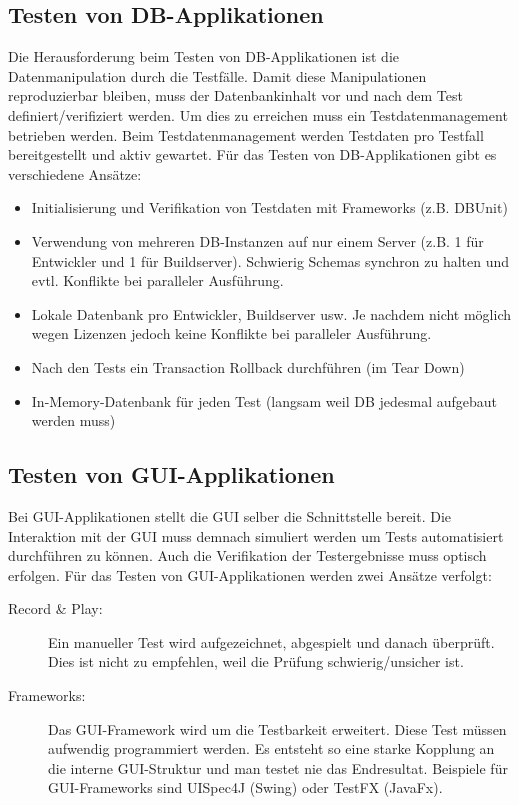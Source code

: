 \subsection{Testen von DB-Applikationen}

Die Herausforderung beim Testen von DB-Applikationen ist die Datenmanipulation durch die Testfälle. Damit diese Manipulationen reproduzierbar bleiben, muss der Datenbankinhalt vor und nach dem Test definiert/verifiziert werden. Um dies zu erreichen muss ein Testdatenmanagement betrieben werden. Beim Testdatenmanagement werden Testdaten pro Testfall bereitgestellt und aktiv gewartet.
Für das Testen von DB-Applikationen gibt es verschiedene Ansätze:
\begin{itemize}
	\item Initialisierung und Verifikation von Testdaten mit Frameworks (z.B. DBUnit)
	\item Verwendung von mehreren DB-Instanzen auf nur einem Server (z.B. 1 für Entwickler und 1 für Buildserver). Schwierig Schemas synchron zu halten und evtl. Konflikte bei paralleler Ausführung.
	\item Lokale Datenbank pro Entwickler, Buildserver usw. Je nachdem nicht möglich wegen Lizenzen jedoch keine Konflikte bei paralleler Ausführung.
	\item Nach den Tests ein Transaction Rollback durchführen (im Tear Down)
	\item In-Memory-Datenbank für jeden Test (langsam weil DB jedesmal aufgebaut werden muss)
\end{itemize}

\subsection{Testen von GUI-Applikationen}

Bei GUI-Applikationen stellt die GUI selber die Schnittstelle bereit. Die Interaktion mit der GUI muss demnach simuliert werden um Tests automatisiert durchführen zu können. Auch die Verifikation der Testergebnisse muss optisch erfolgen. Für das Testen von GUI-Applikationen werden zwei Ansätze verfolgt:
\begin{description}
	\item[Record \& Play:] Ein manueller Test wird aufgezeichnet, abgespielt und danach überprüft. Dies ist nicht zu empfehlen, weil die Prüfung schwierig/unsicher ist.
	\item[Frameworks:] Das GUI-Framework wird um die Testbarkeit erweitert. Diese Test müssen aufwendig programmiert werden. Es entsteht so eine starke Kopplung an die interne GUI-Struktur und man testet nie das Endresultat. Beispiele für GUI-Frameworks sind UISpec4J (Swing) oder TestFX (JavaFx).
\end{description}


